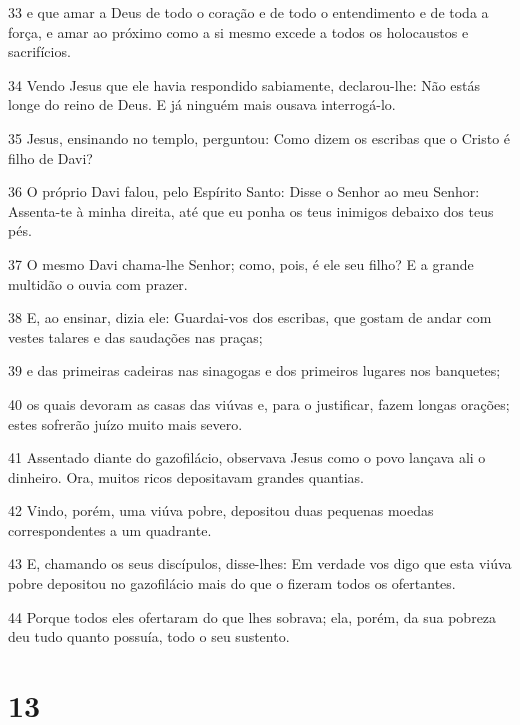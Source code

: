 \par 33 e que amar a Deus de todo o coração e de todo o entendimento e de toda a força, e amar ao próximo como a si mesmo excede a todos os holocaustos e sacrifícios.
\par 34 Vendo Jesus que ele havia respondido sabiamente, declarou-lhe: Não estás longe do reino de Deus. E já ninguém mais ousava interrogá-lo.
\par 35 Jesus, ensinando no templo, perguntou: Como dizem os escribas que o Cristo é filho de Davi?
\par 36 O próprio Davi falou, pelo Espírito Santo: Disse o Senhor ao meu Senhor: Assenta-te à minha direita, até que eu ponha os teus inimigos debaixo dos teus pés.
\par 37 O mesmo Davi chama-lhe Senhor; como, pois, é ele seu filho? E a grande multidão o ouvia com prazer.
\par 38 E, ao ensinar, dizia ele: Guardai-vos dos escribas, que gostam de andar com vestes talares e das saudações nas praças;
\par 39 e das primeiras cadeiras nas sinagogas e dos primeiros lugares nos banquetes;
\par 40 os quais devoram as casas das viúvas e, para o justificar, fazem longas orações; estes sofrerão juízo muito mais severo.
\par 41 Assentado diante do gazofilácio, observava Jesus como o povo lançava ali o dinheiro. Ora, muitos ricos depositavam grandes quantias.
\par 42 Vindo, porém, uma viúva pobre, depositou duas pequenas moedas correspondentes a um quadrante.
\par 43 E, chamando os seus discípulos, disse-lhes: Em verdade vos digo que esta viúva pobre depositou no gazofilácio mais do que o fizeram todos os ofertantes.
\par 44 Porque todos eles ofertaram do que lhes sobrava; ela, porém, da sua pobreza deu tudo quanto possuía, todo o seu sustento.

\chapter{13}

